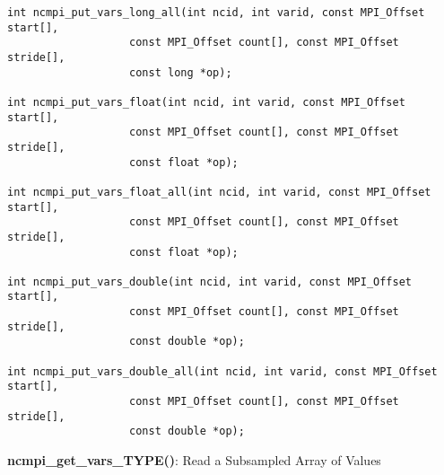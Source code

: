 \begin{verbatim}
int ncmpi_put_vars_long_all(int ncid, int varid, const MPI_Offset start[],
                   const MPI_Offset count[], const MPI_Offset stride[],
                   const long *op); 

int ncmpi_put_vars_float(int ncid, int varid, const MPI_Offset start[],
                   const MPI_Offset count[], const MPI_Offset stride[],
                   const float *op); 

int ncmpi_put_vars_float_all(int ncid, int varid, const MPI_Offset start[],
                   const MPI_Offset count[], const MPI_Offset stride[],
                   const float *op);

int ncmpi_put_vars_double(int ncid, int varid, const MPI_Offset start[],
                   const MPI_Offset count[], const MPI_Offset stride[],
                   const double *op); 

int ncmpi_put_vars_double_all(int ncid, int varid, const MPI_Offset start[],
                   const MPI_Offset count[], const MPI_Offset stride[],
                   const double *op); 
\end{verbatim}


{\bf ncmpi\_get\_vars\_TYPE()}: Read a Subsampled Array of Values

